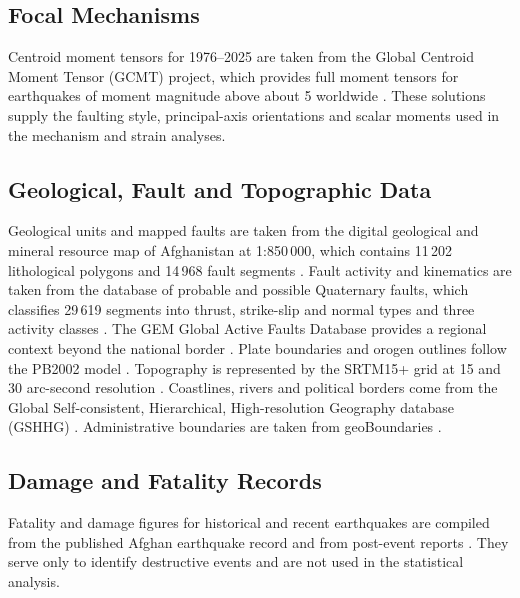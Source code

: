 \documentclass[11pt]{article}
\begin{document}
\subsection{Focal Mechanisms}
Centroid moment tensors for 1976--2025 are taken from the Global Centroid Moment
Tensor (GCMT) project, which provides full moment tensors for earthquakes of
moment magnitude above about 5 worldwide \cite{Dziewonski1981, Ekstrom2012}. These
solutions supply the faulting style, principal-axis orientations and scalar moments
used in the mechanism and strain analyses.

\subsection{Geological, Fault and Topographic Data}
Geological units and mapped faults are taken from the digital geological and mineral
resource map of Afghanistan at 1:850\,000, which contains 11\,202 lithological
polygons and 14\,968 fault segments \cite{Doebrich2006}. Fault activity and
kinematics are taken from the database of probable and possible Quaternary faults,
which classifies 29\,619 segments into thrust, strike-slip and normal types and
three activity classes \cite{Ruleman2007}. The GEM Global Active Faults Database
provides a regional context beyond the national border \cite{Styron2020}. Plate
boundaries and orogen outlines follow the PB2002 model \cite{Bird2003}. Topography
is represented by the SRTM15+ grid at 15 and 30 arc-second resolution
\cite{Tozer2019}. Coastlines, rivers and political borders come from the
Global Self-consistent, Hierarchical, High-resolution Geography database (GSHHG)
\cite{Wessel1996}. Administrative boundaries are taken from geoBoundaries
\cite{Runfola2020}.

\subsection{Damage and Fatality Records}
Fatality and damage figures for historical and recent earthquakes are compiled from
the published Afghan earthquake record and from post-event reports
\cite{Ambraseys2003, WorldBank2024}. They serve only to identify destructive events
and are not used in the statistical analysis.
\end{document}
